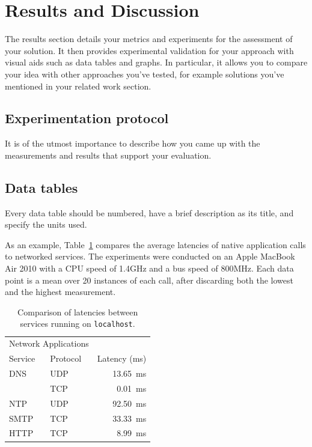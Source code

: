 \documentclass{scrartcl}
\begin{document}
\section{Results and Discussion}

The results section details your metrics and experiments for the assessment of your solution. It then provides experimental validation for your approach with visual aids such as data tables and graphs. In particular, it allows you to compare your idea with other approaches you've tested, for example solutions you've mentioned in your related work section.

\subsection{Experimentation protocol}

It is of the utmost importance to describe how you came up with the measurements and results that support your evaluation.

\subsection{Data tables}

Every data table should be numbered, have a brief description as its title, and specify the units used.

As an example, Table~\ref{tab:my_label} compares the average latencies of native application calls to networked services. The experiments were conducted on an Apple MacBook Air 2010 with a CPU speed of 1.4GHz and a bus speed of 800MHz. Each data point is a mean over 20 instances of each call, after discarding both the lowest and the highest measurement.

\begin{table}[ht]
    \centering
    \begin{tabular}{llr}
\hline
\multicolumn{2}{c}{Network Applications} \\
\cline{1-2}
Service    & Protocol & Latency (\si{\ms}) \\
\hline
DNS         & UDP       & \SI{13.65}{\ms}      \\
            & TCP       & \SI{0.01}{\ms}       \\
NTP         & UDP       & \SI{92.50}{\ms}      \\
SMTP        & TCP       & \SI{33.33}{\ms}      \\
HTTP        & TCP       & \SI{8.99}{\ms}       \\
\hline
\end{tabular}
    \caption{Comparison of latencies between services running on \texttt{localhost}.}
    \label{tab:my_label}
\end{table}
\end{document}
